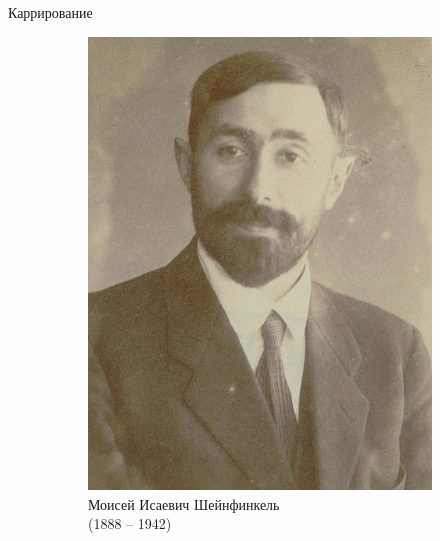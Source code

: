 \begin{frame}{Каррирование}
\begin{figure}[t]
\begin{subfigure}[t]{0.6\textwidth}
  \end{subfigure}
\hspace{1cm}
  \begin{subfigure}[t]{0.3\textwidth}
      \begin{minipage}{1\textwidth}
    \vspace{-3mm}  \includegraphics[width=1\textwidth]{440px-Moses_Schonfinkel_1922_(cropped).jpg}\\
      \centering
  Моисей Исаевич Шейнфинкель \\
  (1888 -- 1942)
\end{minipage}
  \end{subfigure}
\end{figure}
\end{frame}


